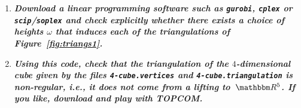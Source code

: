 \begin{enumerate}
  \item
      \textbf{\textit{Download a linear programming software such as \texttt{gurobi}, \texttt{cplex} or \texttt{scip}/\texttt{soplex} and check explicitly whether there exists a choice of heights $\omega$ that induces each of the triangulations of Figure~\ref{fig:triangs1}.}}


  \item
      \textbf{\textit{Using this code, check that the triangulation of the $4$-dimensional cube given by the files \texttt{4-cube.vertices} and \texttt{4-cube.triangulation} is non-regular, i.e., it does not come from a lifting to~$\RR^5$. If you like, download and play with TOPCOM.}}
  \end{enumerate}
